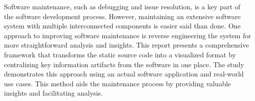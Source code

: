 
Software maintenance, such as debugging and issue resolution, is a key part of the software development process. However, maintaining an extensive software system with multiple interconnected components is easier said than done. One approach to improving software maintenance is reverse engineering the system for more straightforward analysis and insights. This report presents a comprehensive framework that transforms the static source code into a visualized format by centralizing key information artifacts from the software in one place. The study demonstrates this approach using an actual software application and real-world use cases. This method aids the maintenance process by providing valuable insights and facilitating analysis.